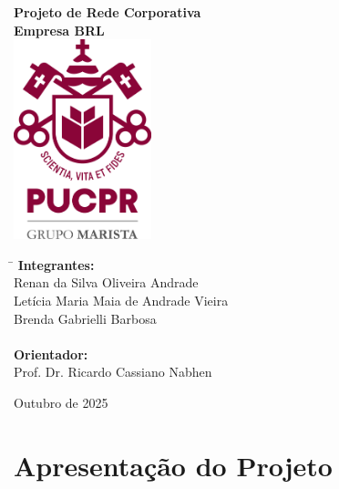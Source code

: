 \documentclass[a4paper, 12pt]{article}
\begin{document}
\begin{titlepage}
    \begin{center}
        \vspace*{1cm}
        {\Large{\textbf{Projeto de Rede Corporativa}}}\\
        \vspace{0.8cm}
        {\large{\textbf{Empresa BRL}}}\\
        \vspace{1.2cm}
        \includegraphics[width=0.3\textwidth]{pucpr.png}
        \vspace{1.2cm}
        
        \begin{flushleft}
            \begin{tabbing}
                \hspace{3cm} \= \kill
                \textbf{Integrantes:} \\
                \> Renan da Silva Oliveira Andrade \\
                \> Letícia Maria Maia de Andrade Vieira \\
                \> Brenda Gabrielli Barbosa \\
                \\
                \textbf{Orientador:} \\
                \> Prof. Dr. Ricardo Cassiano Nabhen \\
            \end{tabbing}
        \end{flushleft}
        \vspace{\fill}
        \large{Outubro de 2025}
    \end{center}
\end{titlepage}

\tableofcontents
\thispagestyle{empty}
\newpage


\section{Apresentação do Projeto}
\label{sec:apresentacao}
\end{document}
